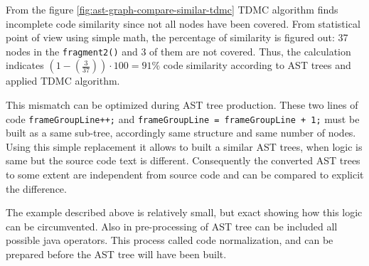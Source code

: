 \documentclass{report}
\begin{document}
From the figure \ref{fig:ast-graph-compare-similar-tdmc} TDMC algorithm finds incomplete code similarity since not all nodes have been covered. From statistical point of view using simple math, the percentage of similarity is figured out: 37 nodes in the \texttt{fragment2()} and 3 of them are not covered. Thus, the calculation indicates  $\left ( 1 - \left (\frac{3}{37} \right ) \right )\cdot 100 = 91\%$ code similarity according to AST trees and applied TDMC algorithm.

This mismatch can be optimized during AST tree production. These two lines of code \texttt{frameGroupLine++;} and \texttt{frameGroupLine = frameGroupLine + 1;}
must be built as a same sub-tree, accordingly same structure and same number of nodes. Using this simple replacement it allows to built a similar AST trees, when logic is same but the source code text is different. Consequently the converted AST trees to some extent are independent from source code and can be compared to explicit the difference.

The example described above is relatively small, but exact showing how this logic can be circumvented. Also in pre-processing of AST tree can be included all possible java operators. This process called code normalization, and can be prepared before the AST tree will have been built. \\
\end{document}
